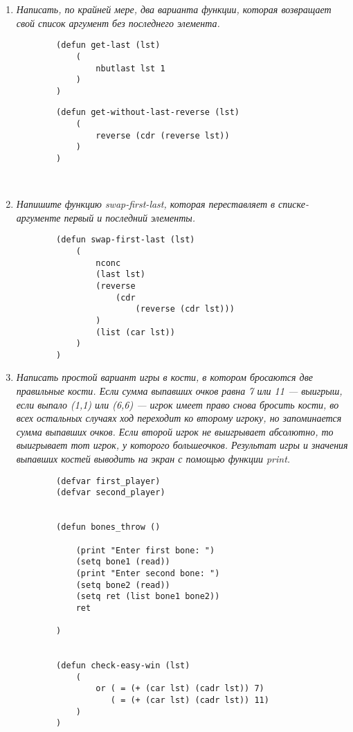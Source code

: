\begin{enumerate}[wide=0pt]
	\begin{lstlisting}
		(defun get-last-reverse (lst)
			(
				car (reverse lst)
			)
		)
	


	\end{lstlisting}

	\item  \textit{Написать, по крайней мере, два варианта функции, 
	которая возвращает
	свой список аргумент без последнего элемента.}

	\begin{lstlisting}
		(defun get-last (lst)
			(
				nbutlast lst 1
			)
		)
	\end{lstlisting}

	\begin{lstlisting}
		(defun get-without-last-reverse (lst)
			(
				reverse (cdr (reverse lst))
			)
		)
	
	
	\end{lstlisting}

	\item  \textit{Напишите функцию swap-first-last, 
	которая переставляет в списке-
	аргументе первый и последний элементы.}
	
	\begin{lstlisting}
		(defun swap-first-last (lst)
			(
				nconc 
				(last lst)
				(reverse 
					(cdr 
						(reverse (cdr lst)))
				)
				(list (car lst))
			)
		)
	\end{lstlisting}

	\item  \textit{Написать простой вариант игры в кости, в котором бросаются две
	правильные кости. Если сумма выпавших очков равна 7 или 11 —
	выигрыш, если выпало (1,1) или (6,6) — игрок имеет право снова
	бросить кости, во всех остальных случаях ход переходит ко второму
	игроку, но запоминается сумма выпавших очков. Если второй игрок не
	выигрывает абсолютно, то выигрывает тот игрок, у которого большеочков. Результат игры и значения выпавших костей выводить на экран с
	помощью функции print.}

	\begin{lstlisting}
		(defvar first_player)
		(defvar second_player)
		
		
		(defun bones_throw ()
		
			(print "Enter first bone: ")
			(setq bone1 (read))
			(print "Enter second bone: ")
			(setq bone2 (read))
			(setq ret (list bone1 bone2))
			ret
		
		)
		
		
		(defun check-easy-win (lst)
			(
				or ( = (+ (car lst) (cadr lst)) 7)
				   ( = (+ (car lst) (cadr lst)) 11)
			)
		)
		

\end{lstlisting}
\end{enumerate}
